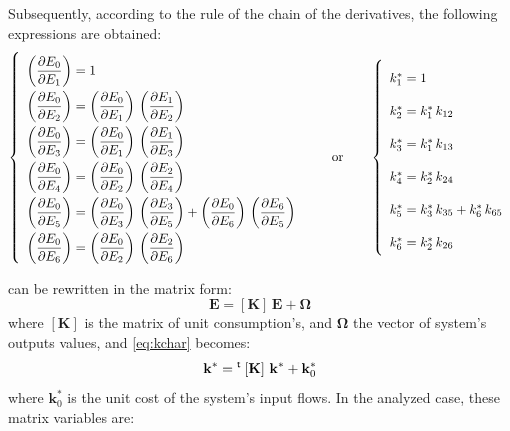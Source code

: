 \documentclass[energies,article,submit,moreauthors,pdftex]{Definitions/mdpi}
\newcommand{\vm}[1]{\ensuremath{\mathbf{#1}}}
\newcommand{\tm}{\ensuremath{\prescript{\smash{\mathsf{t}}}{}{\mskip1mu}}}
\newcommand{\dpartial}[2]{\left(\dfrac{\partial E_{#1}}{\partial E_{#2}}\right)}
\begin{document}
Subsequently, according to the rule of the chain of the derivatives, the following expressions are obtained:
\begin{equation}
    \def\arraystretch{2.1}
    \left\{\begin{array}{l}
       \dpartial{0}{1}=1 \\
       \dpartial{0}{2}=\dpartial{0}{1}\,\dpartial{1}{2} \\
       \dpartial{0}{3}=\dpartial{0}{1}\,\dpartial{1}{3} \\
       \dpartial{0}{4}=\dpartial{0}{2}\,\dpartial{2}{4} \\
       \dpartial{0}{5}=\dpartial{0}{3}\,\dpartial{3}{5} + \dpartial{0}{6}\,\dpartial{6}{5} \\
       \dpartial{0}{6}=\dpartial{0}{2}\,\dpartial{2}{6} \\
    \end{array}\right.
    \qquad
    \text{or}
    \qquad
       \left\{\begin{array}{l}
        k_1^* = 1 \\
        k_2^* = k_1^*\,k_{12} \\
        k_3^* = k_1^*\,k_{13} \\
        k_4^* = k_2^*\,k_{24} \\
        k_5^* = k_3^*\,k_{35} + k_6^*\,k_{65} \\
        k_6^* = k_2^*\,k_{26} \\
    \end{array}\right.
    \label{eq:kgenplant}
\end{equation}

 can be rewritten in the matrix form:
\begin{equation}
    \vm{E}=\left[\vm{K}\right]\,\vm{E}+\vm{\Omega}
    \label{eq:mechar}
\end{equation}
where $\left[\vm{K}\right]$ is the matrix of unit consumption's, and $\vm{\Omega}$ the vector of system's outputs values, and \cref{eq:kchar} becomes:
\begin{equation}
    \vm{k}^* = \tm\left[\vm{K}\right]\,\vm{k}^* + \vm{k}_0^*
    \label{eq:mkchar}
\end{equation}
where $\vm{k}_0^*$ is the unit cost of the system's input flows. In the analyzed case, these matrix variables are:
\end{document}
